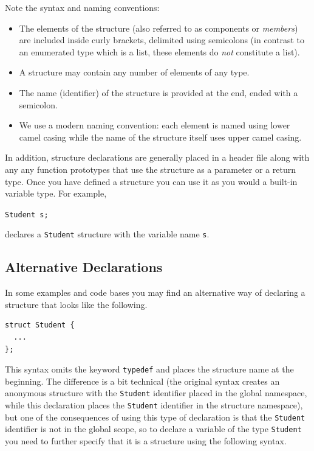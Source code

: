 Note the syntax and naming conventions:
\begin{itemize}
  \item The elements of the structure (also referred to as components 
    or \emph{members}) are included inside curly brackets, 
  	delimited using semicolons (in contrast to an enumerated type which 
	is a list, these elements do \emph{not} constitute a list).
  \item A structure may contain any number of elements of any type.
  \item The name (identifier) of the structure is provided at the end, ended with
  	a semicolon.
  \item We use a modern naming convention: each element is named
  	using lower camel casing while the name of the structure itself
	uses upper camel casing.
\end{itemize}

In addition, structure declarations are generally placed in a header 
file along with any any function prototypes that use the structure as 
a parameter or a return type.  Once you have defined a structure you
can use it as you would a built-in variable type.  For example, 

\texttt{Student s;}

declares a \texttt{Student} structure with the variable
name \texttt{s}.

\subsection{Alternative Declarations}

In some examples and code bases you may find an alternative way
of declaring a structure that looks like the following.

\begin{verbatim}
struct Student {
  ...
};
\end{verbatim}

This syntax omits the keyword \texttt{typedef} and places
the structure name at the beginning.  The difference is a bit 
technical (the original syntax creates an anonymous structure
with the \texttt{Student} identifier placed in the 
global namespace, while this declaration places the
\texttt{Student} identifier in the structure namespace), 
but one of the consequences of using this type of
declaration is that the \texttt{Student} identifier
is not in the global scope, so to declare a variable of the
type \texttt{Student} you need to further specify that
it is a structure using the following syntax.

